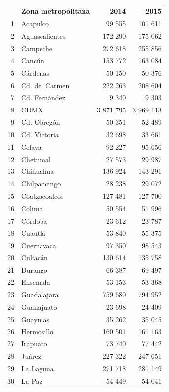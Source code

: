 \documentclass[]{article}
\begin{document}
\begin{table}[H]
\centering
\begingroup\scriptsize
\begin{tabular}{rlrr}
  \hline
 & Zona metropolitana & 2014 & 2015 \\ 
  \hline
1 & Acapulco & 99 555 & 101 611 \\ 
  2 & Aguascalientes & 172 290 & 175 062 \\ 
  3 & Campeche & 272 618 & 255 856 \\ 
  4 & Cancún & 153 772 & 163 084 \\ 
  5 & Cárdenas & 50 150 & 50 376 \\ 
  6 & Cd. del Carmen & 222 263 & 208 604 \\ 
  7 & Cd. Fernández & 9 340 & 9 303 \\ 
  8 & CDMX & 3 871 795 & 3 969 113 \\ 
  9 & Cd. Obregón & 50 351 & 52 489 \\ 
  10 & Cd. Victoria & 32 698 & 33 661 \\ 
  11 & Celaya & 92 227 & 95 656 \\ 
  12 & Chetumal & 27 573 & 29 987 \\ 
  13 & Chihuahua & 136 924 & 143 291 \\ 
  14 & Chilpancingo & 28 238 & 29 072 \\ 
  15 & Coatzacoalcos & 127 481 & 127 700 \\ 
  16 & Colima & 50 554 & 51 996 \\ 
  17 & Córdoba & 23 612 & 23 787 \\ 
  18 & Cuautla & 53 840 & 55 375 \\ 
  19 & Cuernavaca & 97 350 & 98 543 \\ 
  20 & Culiacán & 130 614 & 135 758 \\ 
  21 & Durango & 66 387 & 69 497 \\ 
  22 & Ensenada & 53 153 & 53 368 \\ 
  23 & Guadalajara & 759 680 & 794 952 \\ 
  24 & Guanajuato & 23 698 & 24 409 \\ 
  25 & Guaymas & 35 262 & 35 045 \\ 
  26 & Hermosillo & 160 501 & 161 163 \\ 
  27 & Irapuato & 73 740 & 77 442 \\ 
  28 & Juárez & 227 322 & 247 651 \\ 
  29 & La Laguna & 271 718 & 281 149 \\ 
  30 & La Paz & 54 449 & 54 041 \\ 

\end{tabular}
\end{table}
\end{document}
